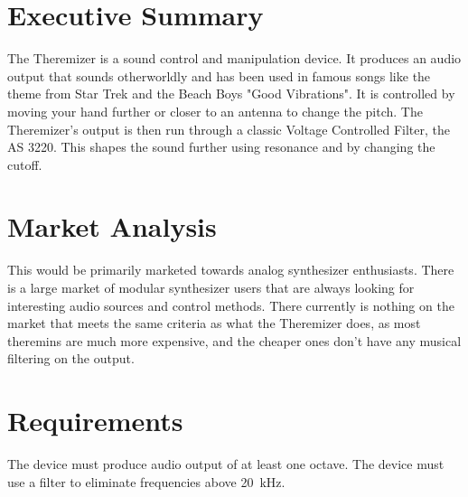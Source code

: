 \documentclass[11pt]{report}
\begin{document}
	\section{Executive Summary}
	The Theremizer is a sound control and manipulation device. It produces an audio output that sounds otherworldly and has been used in famous songs like the theme from Star Trek and the Beach Boys "Good Vibrations". It is controlled by moving your hand further or closer to an antenna to change the pitch. The Theremizer's output is then run through a classic Voltage Controlled Filter, the AS 3220. This shapes the sound further using resonance and by changing the cutoff.
	\section{Market Analysis}
	This would be primarily marketed towards analog synthesizer enthusiasts. There is a large market of modular synthesizer users that are always looking for interesting audio sources and control methods. There currently is nothing on the market that meets the same criteria as what the Theremizer does, as most theremins are much more expensive, and the cheaper ones don't have any musical filtering on the output. 
	\section{Requirements}
		The device must produce audio output of at least one octave. The device must use a filter to eliminate frequencies above \SI{20}{\kilo\hertz}. 
\end{document}
